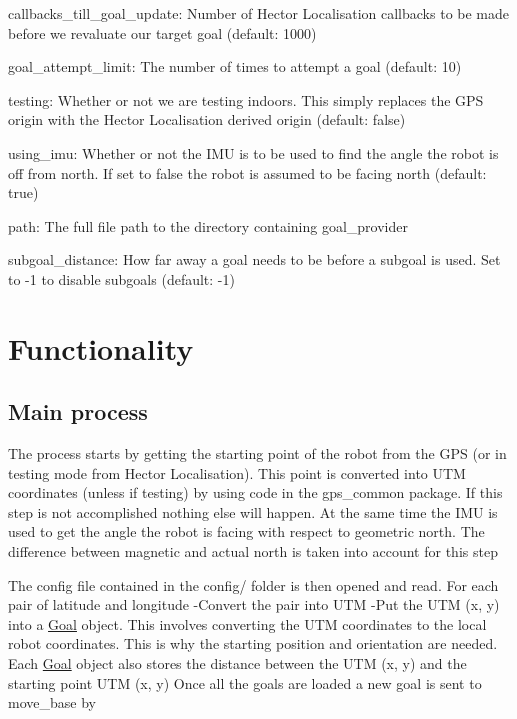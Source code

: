 \begin{DoxyItemize}
\item {\ttfamily callbacks\-\_\-till\-\_\-goal\-\_\-update\-:} \-Number of \-Hector \-Localisation callbacks to be made before we revaluate our target goal (default\-: 1000)
\item {\ttfamily goal\-\_\-attempt\-\_\-limit\-:} \-The number of times to attempt a goal (default\-: 10)
\item {\ttfamily testing\-:} \-Whether or not we are testing indoors. \-This simply replaces the \-G\-P\-S origin with the \-Hector \-Localisation derived origin (default\-: false)
\item {\ttfamily using\-\_\-imu\-:} \-Whether or not the \-I\-M\-U is to be used to find the angle the robot is off from north. \-If set to false the robot is assumed to be facing north (default\-: true)
\item {\ttfamily path\-:} \-The full file path to the directory containing goal\-\_\-provider
\item {\ttfamily subgoal\-\_\-distance\-:} \-How far away a goal needs to be before a subgoal is used. \-Set to -\/1 to disable subgoals (default\-: -\/1)
\end{DoxyItemize}\hypertarget{index_functionality}{}\section{\-Functionality}\label{index_functionality}
\hypertarget{index_mainAlogrithm}{}\subsection{\-Main process}\label{index_mainAlogrithm}
\-The process starts by getting the starting point of the robot from the \-G\-P\-S (or in testing mode from \-Hector \-Localisation). \-This point is converted into \-U\-T\-M coordinates (unless if testing) by using code in the gps\-\_\-common package. \-If this step is not accomplished nothing else will happen. \-At the same time the \-I\-M\-U is used to get the angle the robot is facing with respect to geometric north. \-The difference between magnetic and actual north is taken into account for this step \par
 \par
 \-The config file contained in the config/ folder is then opened and read. \-For each pair of latitude and longitude -\/\-Convert the pair into \-U\-T\-M -\/\-Put the \-U\-T\-M (x, y) into a \hyperlink{classGoal}{\-Goal} object. \-This involves converting the \-U\-T\-M coordinates to the local robot coordinates. \-This is why the starting position and orientation are needed. \-Each \hyperlink{classGoal}{\-Goal} object also stores the distance between the \-U\-T\-M (x, y) and the starting point \-U\-T\-M (x, y) \-Once all the goals are loaded a new goal is sent to move\-\_\-base by

